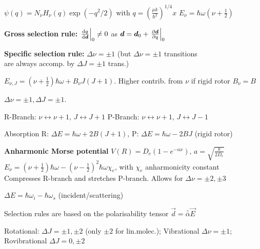 \begin{squishlist}
    \item $\psi(q) = N_{\nu} H_{\nu}(q) \exp(-q^2/2)$ with $q = \left(\frac{\mu k}{\hbar^2}\right)^{1/4}x$ \squishsep $E_{\nu} = \hbar \omega (\nu + \frac{1}{2})$
    \item \textbf{Gross selection rule:} $\left.\der{\vec{d}}{q}\right|_0 \neq 0$ \quad as $\vec{d} = \vec{d}_0 + \left. \D{q}{\vec{d}}\right|_0$
    \item \textbf{Specific selection rule:} $\Delta \nu = \pm 1$ (but $\Delta \nu = \pm 1$ transitions \\ are always accomp. by $\Delta J = \pm 1$ trans.)
\end{squishlist}

\begin{squishlist}
    \item $E_{\nu, J} = (\nu + \frac{1}{2}) \hbar \omega + B_{\nu} J(J+1)$. Higher contrib. from $\nu$ \squishsep if rigid rotor $B_{\nu} = B$
    \item $\Delta \nu = \pm 1, \Delta J = \pm 1$.
    \item R-Branch: $\nu \leftrightarrow \nu + 1,\, J \leftrightarrow J+1$ \quad P-Branch:  $\nu \leftrightarrow \nu + 1, \,  J \leftrightarrow J-1$
    \item Absorption \quad R: $\Delta E = \hbar \omega + 2B(J+1)$, P: $\Delta E = \hbar \omega - 2BJ$ (rigid rotor)
    \item \textbf{Anharmonic Morse potential} $V(R) = D_e (1 - e^{-ax}), \, a = \sqrt{\frac{k}{2D_e}}$ \\
    $E_{\nu} = (\nu+\frac{1}{2}) \hbar \omega - (\nu - \frac{1}{2})^2 \hbar \omega \chi_e$, with $\chi_e$ anharmonicity constant \\
    Compresses R-branch and stretches P-branch. Allows for $\Delta \nu = \pm 2, \pm 3$
\end{squishlist}

\begin{squishlist}
    \item $\Delta E = \hbar \omega_i - \hbar \omega_s$ (incident/scattering)
    \item Selection rules are based on the polarisability tensor $\vec{d} = \bar{\bar{\alpha}} \vec{E}$
    \item Rotational: $\Delta J = \pm 1, \pm 2$ (only $\pm 2$ for lin.molec.); Vibrational $\Delta \nu  =\pm 1$; \\ Rovibrational $\Delta J = 0, \pm 2$
\end{squishlist}

